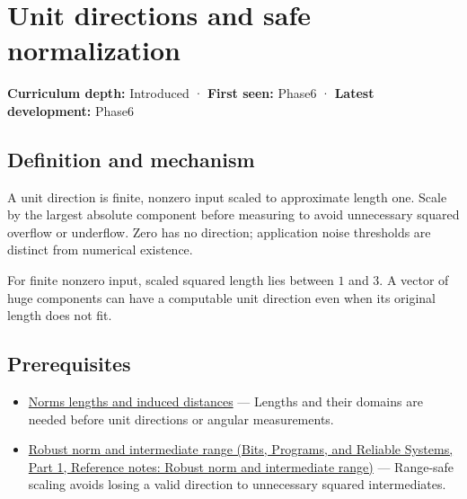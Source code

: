 \hypertarget{appendix-f744e41b95b4}{}\label{referencestart:appendix-f744e41b95b4}
\section{Unit directions and safe normalization}\label{appendix-f744e41b95b4-unit-directions-and-safe-normalization}

\hypertarget{appendix-f744e41b95b4-unit-directions-and-safe-normalization}{}

\textbf{Curriculum depth:} Introduced · \textbf{First seen:} Phase6 · \textbf{Latest development:} Phase6

\begin{allmightroledefinition}

\subsection{Definition and mechanism}\label{appendix-f744e41b95b4-definition-and-mechanism}

\hypertarget{appendix-f744e41b95b4-definition-and-mechanism}{}

A unit direction is finite, nonzero input scaled to approximate length one. Scale by the largest absolute component before measuring to avoid unnecessary squared overflow or underflow. Zero has no direction; application noise thresholds are distinct from numerical existence.

\end{allmightroledefinition}

For finite nonzero input, scaled squared length lies between \(1\) and \(3\). A vector of huge components can have a computable unit direction even when its original length does not fit.

\subsection{Prerequisites}\label{appendix-f744e41b95b4-prerequisites}

\hypertarget{appendix-f744e41b95b4-prerequisites}{}

\begin{itemize}
\tightlist
\item
  \hyperref[appendix-49933872bb51]{Norms lengths and induced distances} --- Lengths and their domains are needed before unit directions or angular measurements.
\item
  \href{../01-Bits-Programs-and-Reliable-Systems-P01/main.pdf\#nameddest=appendix-7f1e17dcafb1}{Robust norm and intermediate range (Bits, Programs, and Reliable Systems, Part 1, Reference notes: Robust norm and intermediate range)} --- Range-safe scaling avoids losing a valid direction to unnecessary squared intermediates.
\end{itemize}

